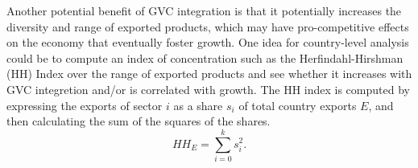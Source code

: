 \documentclass[a4paper]{article}
\begin{document}
Another potential benefit of GVC integration is that it potentially increases the diversity and range of exported products, which may have pro-competitive effects on the economy that eventually foster growth. One idea for country-level analysis could be to compute an index of concentration such as the Herfindahl-Hirshman (HH) Index over the range of exported products and see whether it increases with GVC integretion and/or is correlated with growth. The HH index is computed by expressing the exports of sector $i$ as a share $s_i$ of total country exports $E$, and then calculating the sum of the squares of the shares. 
\begin{equation}
HH_E = \sum_{i =0}^k s_i^2. 
\end{equation} 
\end{document}
